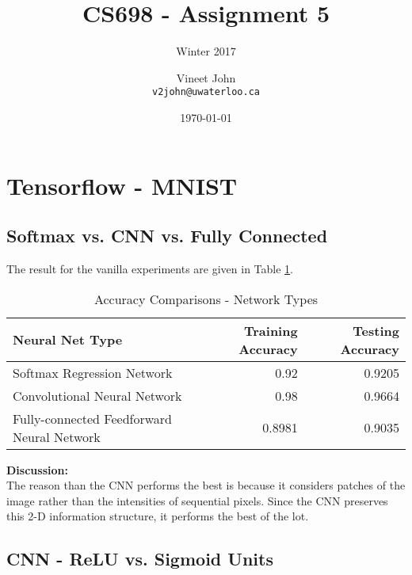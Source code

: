 \documentclass[parskip=half]{scrartcl}
\begin{document}
\title{CS698 - Assignment 5}
\subtitle{Winter 2017}
\author{
    Vineet John\\
    \texttt{v2john@uwaterloo.ca}
}
\date{\today}
\maketitle


\section{Tensorflow - MNIST} %
\label{sec:tensorflow_mnist}

    \subsection{Softmax vs. CNN vs. Fully Connected} %
    \label{sub:softmax_vs_cnn_vs_fully_connected}

        The result for the vanilla experiments are given in Table \ref{tab:accuracy_comparisons_network_types}.
        \begin{table}[th]
            \centering
            \begin{tabular}{| l | r | r |}
            \hline
            \textbf{Neural Net Type} & \textbf{Training Accuracy} & \textbf{Testing Accuracy} \\
            \hline
                \hline
                Softmax Regression Network & 0.92 & 0.9205 \\
                \hline
                Convolutional Neural Network & 0.98 & 0.9664 \\
                \hline
                Fully-connected Feedforward Neural Network & 0.8981 & 0.9035 \\
            \hline
            \end{tabular}
            \caption{Accuracy Comparisons - Network Types}
            \label{tab:accuracy_comparisons_network_types}
        \end{table}

        \textbf{Discussion:}\\
        The reason than the CNN performs the best is because it considers patches of the image rather than the intensities of sequential pixels. Since the CNN preserves this 2-D information structure, it performs the best of the lot.
    

    \subsection{CNN - ReLU vs. Sigmoid Units} %
    \label{sub:cnn_relu_vs_sigmoid_units}
\end{document}
